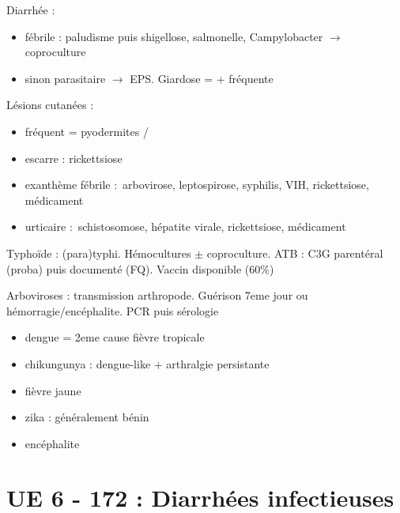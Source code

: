 Diarrhée :
\begin{itemize}
  \item fébrile : paludisme puis shigellose, salmonelle, Campylobacter
    $\rightarrow$ coproculture
  \item sinon parasitaire $\rightarrow$ EPS. Giardose = + fréquente
\end{itemize}

Lésions cutanées : 
\begin{itemize}
  \item fréquent = pyodermites /
  \item escarre : rickettsiose
  \item exanthème fébrile : arbovirose, leptospirose, syphilis, VIH,
    rickettsiose, médicament
  \item urticaire : schistosomose, hépatite virale, rickettsiose, médicament
\end{itemize} 

Typhoïde :  (para)typhi. Hémocultures $\pm$ coproculture. ATB :
C3G parentéral (proba) puis documenté (FQ). Vaccin disponible (60\%)

\vspace{10pt}
Arboviroses : transmission arthropode. Guérison 7eme jour ou
hémorragie/encéphalite. PCR puis sérologie
\begin{itemize}
  \item dengue = 2eme cause fièvre tropicale
  \item chikungunya : dengue-like + arthralgie persistante
  \item fièvre jaune
  \item zika : généralement bénin
  \item encéphalite
\end{itemize}

\section{UE 6 - 172 : Diarrhées infectieuses}%
\label{sec:ue_6_172_diarrhees_infectieuses}

